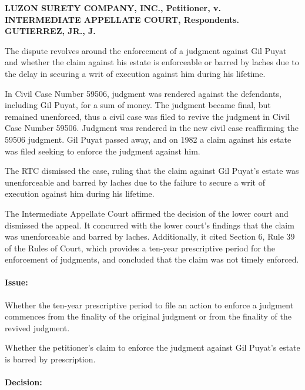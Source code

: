 \documentclass[
12pt,
oneside,
onehalfspacing,
headsepline
]{DigestCollection}
\begin{document}
\noindent\textbf{LUZON SURETY COMPANY, INC., Petitioner, v. \\INTERMEDIATE APPELLATE COURT, Respondents. GUTIERREZ, JR., J.}\vspace{0.4cm}

The dispute revolves around the enforcement of a judgment against Gil Puyat and whether the claim against his estate is enforceable or barred by laches due to the delay in securing a writ of execution against him during his lifetime.

In Civil Case Number 59506, judgment was rendered against the defendants, including Gil Puyat, for a sum of money. The judgment became final, but remained unenforced, thus a civil case was filed to revive the judgment in Civil Case Number 59506. Judgment was rendered in the new civil case reaffirming the 59506 judgment. Gil Puyat passed away, and on 1982 a claim against his estate was filed seeking to enforce the judgment against him.

The RTC dismissed the case, ruling that the claim against Gil Puyat's estate was unenforceable and barred by laches due to the failure to secure a writ of execution against him during his lifetime.

The Intermediate Appellate Court affirmed the decision of the lower court and dismissed the appeal. It concurred with the lower court's findings that the claim was unenforceable and barred by laches. Additionally, it cited Section 6, Rule 39 of the Rules of Court, which provides a ten-year prescriptive period for the enforcement of judgments, and concluded that the claim was not timely enforced.

\paragraph{Issue:}
\label{2315a740-1250-11ef-aa24-9916ea601717}


Whether the ten-year prescriptive period to file an action to enforce a judgment commences from the finality of the original judgment or from the finality of the revived judgment.

Whether the petitioner's claim to enforce the judgment against Gil Puyat's estate is barred by prescription.

\paragraph{Decision:}
\label{20e0c5e0-1250-11ef-aa24-9916ea601717}
\end{document}
